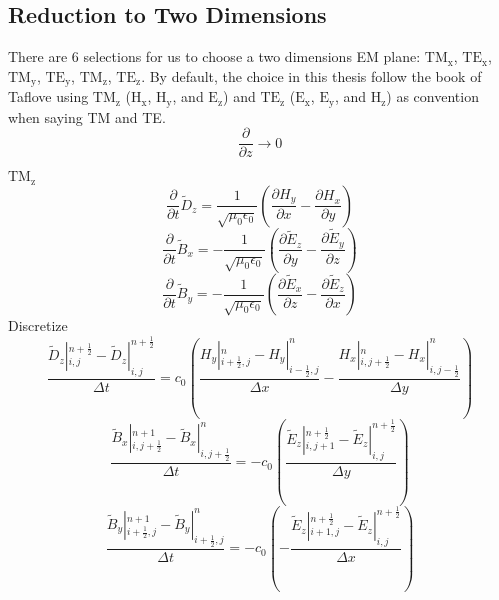 \subsection{Reduction to Two Dimensions}
There are 6 selections for us to choose a two dimensions EM plane: $\mathrm{TM_{x}} $, $\mathrm{TE_{x}}$,
$\mathrm{TM_{y}}$, $\mathrm{TE_{y}}$, $\mathrm{TM_{z}}$, $\mathrm{TE_{z}}$. By default, the choice in this thesis follow
the book of Taflove using $\mathrm{TM_{z}}$ ($\mathrm{H_x}$, $\mathrm{H_y}$, and $\mathrm{E_z}$) and $\mathrm{TE_{z}}$
($\mathrm{E_x}$, $\mathrm{E_y}$, and $\mathrm{H_z}$) as convention when saying TM and TE.
\begin{displaymath}
  \frac{\partial}{\partial z} \rightarrow 0
\end{displaymath}

$\mathrm{TM_z}$
\begin{displaymath}
  \frac{\partial}{\partial t}\widetilde{D}_z = \frac{1}{\sqrt{\mu_0\epsilon_0}}\left(\frac{\partial H_y}{\partial x} - \frac{\partial H_x}{\partial y}\right)
\end{displaymath}
\begin{displaymath}
  \frac{\partial}{\partial t}\widetilde{B}_x =-\frac{1}{\sqrt{\mu_0\epsilon_0}}\left(\frac{\partial \widetilde{E}_z}{\partial y} - \frac{\partial \widetilde{E}_y}{\partial z}\right)
\end{displaymath}
\begin{displaymath}
  \frac{\partial}{\partial t}\widetilde{B}_y =-\frac{1}{\sqrt{\mu_0\epsilon_0}}\left(\frac{\partial \widetilde{E}_x}{\partial z} - \frac{\partial \widetilde{E}_z}{\partial x}\right)
\end{displaymath}
Discretize
\begin{displaymath}
  \frac{\widetilde{D}_z|_{i,j}^{n+\frac{1}{2}}-\widetilde{D}_z|_{i,j}^{n+\frac{1}{2}}}{\Delta t} =
  c_0 \left(\frac{H_y|_{i+\frac{1}{2},j}^{n} - H_y|_{i-\frac{1}{2},j}^n}{\Delta x} - \frac{H_x|_{i,j+\frac{1}{2}}^{n} - H_x|_{i,j-\frac{1}{2}}^{n}}{\Delta y}\right)
\end{displaymath}
\begin{displaymath}
  \frac{\widetilde{B}_x|_{i,j+\frac{1}{2}}^{n+1} - \widetilde{B}_x|_{i,j+\frac{1}{2}}^{n}}{\Delta t} = 
  - c_0\left(\frac{\widetilde{E}_z|_{i,j+1}^{n+\frac{1}{2}} - \widetilde{E}_z|_{i,j}^{n+\frac{1}{2}}}{\Delta y}\right)
\end{displaymath}
\begin{displaymath}
  \frac{\widetilde{B}_y|_{i+\frac{1}{2},j}^{n+1} - \widetilde{B}_y|_{i+\frac{1}{2},j}^{n}}{\Delta t} =
  - c_0\left( - \frac{\widetilde{E}_z|_{i+1,j}^{n+\frac{1}{2}} - \widetilde{E}_z|_{i,j}^{n+\frac{1}{2}}}{\Delta x}\right)
\end{displaymath}


